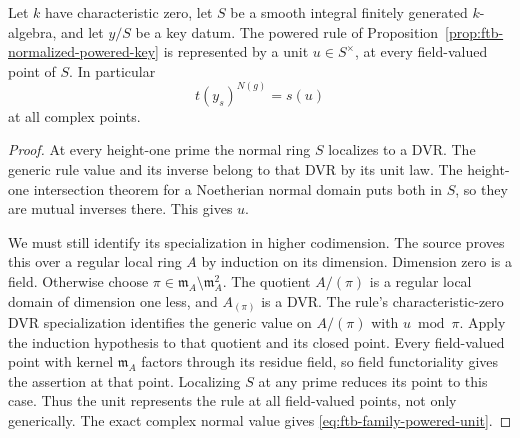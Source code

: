 \begin{srlemma}
\label{lem:ftb-powered-rule-smooth-unit}
Let \(k\) have characteristic zero, let \(S\) be a smooth integral
finitely generated \(k\)-algebra, and let \(y/S\) be a key datum.
The powered rule of
Proposition~\ref{prop:ftb-normalized-powered-key} is represented
by a unit \(u\in S^\times\), at every field-valued point of \(S\).
In particular
\[
                         t(y_s)^{N(g)}=s(u)
 \tag{R4}\label{eq:ftb-family-powered-unit}
\]
at all complex points.
\end{srlemma}
\begin{proof}
At every height-one prime the normal ring \(S\) localizes to a DVR.
The generic rule value and its inverse belong to that DVR
by its unit law.  The height-one intersection theorem for a
Noetherian normal domain puts both in \(S\), so they are
mutual inverses there.  This gives \(u\).

We must still identify its specialization in higher codimension.
The source proves this over a regular local ring \(A\) by
induction on its dimension.
Dimension zero is a field.  Otherwise choose
\(\pi\in\mathfrak m_A\setminus\mathfrak m_A^2\).
The quotient \(A/(\pi)\) is a regular local domain of dimension
one less, and \(A_{(\pi)}\) is a DVR.
The rule's characteristic-zero DVR specialization identifies
the generic value on \(A/(\pi)\) with \(u\bmod\pi\).
Apply the induction hypothesis to that quotient and its closed
point.  Every field-valued point with kernel \(\mathfrak m_A\)
factors through its residue field, so field functoriality gives
the assertion at that point.
Localizing \(S\) at any prime reduces its point to this case.
Thus the unit represents the rule at all field-valued points,
not only generically.
The exact complex normal value gives \eqref{eq:ftb-family-powered-unit}.
\end{proof}

